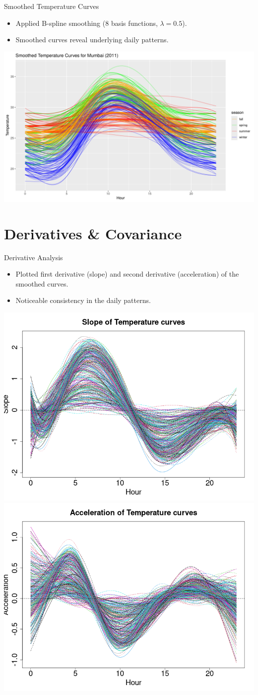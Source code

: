 \documentclass[svgnames, 12pt]{beamer}
\begin{document}
\begin{frame}{Smoothed Temperature Curves}
		\begin{itemize}
		\item Applied B-spline smoothing (8 basis functions, $\lambda=0.5$).
		\item Smoothed curves reveal underlying daily patterns.
	\end{itemize}
	\begin{center}
		\includegraphics[width=0.8\linewidth]{../notebooks/assets/smoothed_temperature_curves.png}
	\end{center}
\end{frame}

\section{Derivatives \& Covariance}

\begin{frame}{Derivative Analysis}
	\begin{itemize}
		\item Plotted first derivative (slope) and second derivative (acceleration) of the smoothed curves.
		\item Noticeable consistency in the daily patterns.
		\end{itemize}
	\begin{center}
		\includegraphics[width=0.48\linewidth]{../notebooks/assets/slope_fd_plot.png}\hfill
		\includegraphics[width=0.48\linewidth]{../notebooks/assets/acceleration_fd_plot.png}
	\end{center}
\end{frame}
\end{document}
